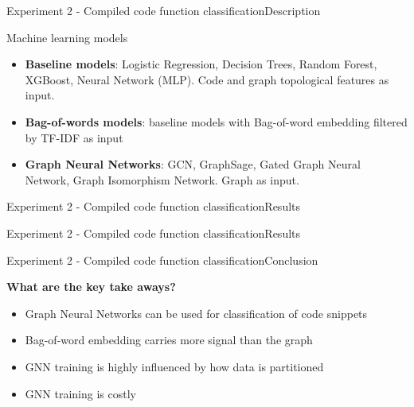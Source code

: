 \documentclass[xcolor=table]{beamer}
\begin{document}
\begin{frame}{Experiment 2 - Compiled code function classification}{Description}

Machine learning models
\begin{itemize}
    \item \textbf{Baseline models}: Logistic Regression, Decision Trees, Random Forest, XGBoost, Neural Network (MLP). Code and graph topological features as input.

    \item \textbf{Bag-of-words models}: baseline models with Bag-of-word embedding filtered by TF-IDF as input

    \item \textbf{Graph Neural Networks}: GCN, GraphSage, Gated Graph Neural Network, Graph Isomorphism Network. Graph as input.
\end{itemize}

\end{frame}


\begin{frame}{Experiment 2 - Compiled code function classification}{Results}





\end{frame}


\begin{frame}{Experiment 2 - Compiled code function classification}{Results}


\end{frame}

\begin{frame}{Experiment 2 - Compiled code function classification}{Conclusion}



\textbf{What are the key take aways?}
\begin{itemize}
    \item Graph Neural Networks can be used for classification of code snippets
    \item Bag-of-word embedding carries more signal than the graph
    \item GNN training is highly influenced by how data is partitioned
    \item GNN training is costly
\end{itemize}

\end{frame}
\end{document}
